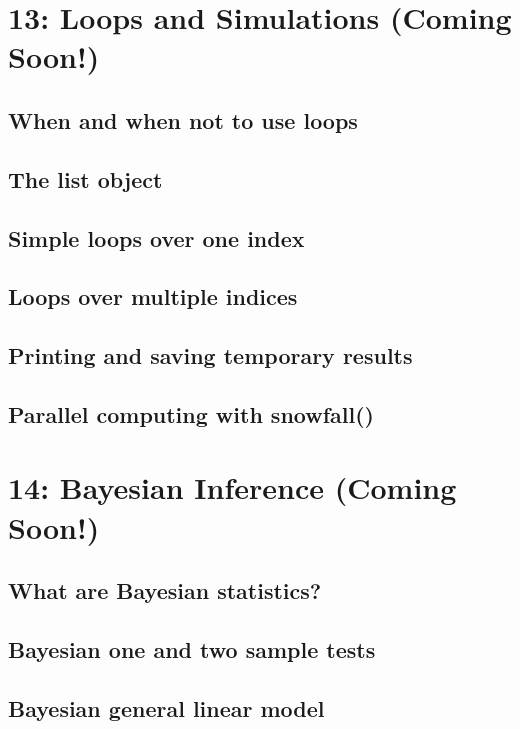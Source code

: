 \documentclass{tufte-book}\usepackage[]{graphicx}\usepackage[]{color}
\begin{document}
\begin{footnotesize}
\chapter{13: Loops and Simulations (Coming Soon!)}
\label{ch:13}

\section{When and when not to use loops}
\section{The list object}
\section{Simple loops over one index}
\section{Loops over multiple indices}
\section{Printing and saving temporary results}
\section{Parallel computing with snowfall()}


\chapter{14: Bayesian Inference (Coming Soon!)}
\label{ch:14}


\section{What are Bayesian statistics?}
\section{Bayesian one and two sample tests}
\section{Bayesian general linear model}



\end{footnotesize}
\end{document}
